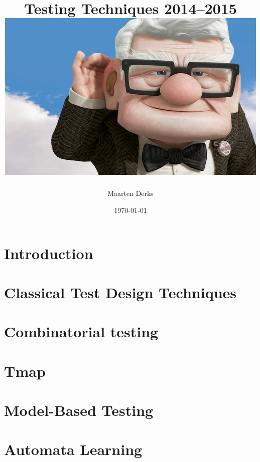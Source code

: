 \documentclass[paper=a4, twocolumn, fontsize=9pt]{scrartcl}
\title{{Testing Techniques 2014--2015}\\
       {\includegraphics{up.jpg}}
}
\author{Maarten Derks}
\date{\today}
\begin{document}
	\maketitle

	\tableofcontents

	\section{Introduction}
	

	\section{Classical Test Design Techniques}
	
	
	\section{Combinatorial testing}
	
	
	\section{Tmap}
	

	\section{Model-Based Testing}
	
	
	\section{Automata Learning}
	
	
\end{document}
